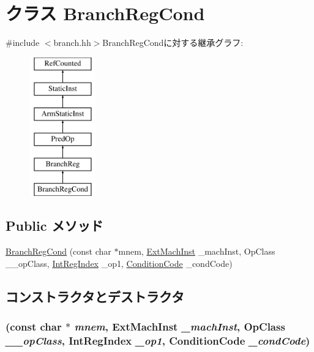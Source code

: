 \hypertarget{classArmISA_1_1BranchRegCond}{
\section{クラス BranchRegCond}
\label{classArmISA_1_1BranchRegCond}
}


{\ttfamily \#include $<$branch.hh$>$}BranchRegCondに対する継承グラフ:\begin{figure}[H]
\begin{center}
\leavevmode
\includegraphics[height=6cm]{classArmISA_1_1BranchRegCond}
\end{center}
\end{figure}
\subsection*{Public メソッド}
\begin{DoxyCompactItemize}
\item 
\hyperlink{classArmISA_1_1BranchRegCond_a78a9660cf99b9b9f1a776c128166c5a1}{BranchRegCond} (const char $\ast$mnem, \hyperlink{classStaticInst_a5605d4fc727eae9e595325c90c0ec108}{ExtMachInst} \_\-machInst, OpClass \_\-\_\-opClass, \hyperlink{namespaceArmISA_ae64680ba9fb526106829d6bf92fc791b}{IntRegIndex} \_\-op1, \hyperlink{namespaceArmISA_ab8f08e777c4753720cff841f81da8e06}{ConditionCode} \_\-condCode)
\end{DoxyCompactItemize}


\subsection{コンストラクタとデストラクタ}
\hypertarget{classArmISA_1_1BranchRegCond_a78a9660cf99b9b9f1a776c128166c5a1}{
\subsubsection[{BranchRegCond}]{ (const char $\ast$ {\em mnem}, \/  {\bf ExtMachInst} {\em \_\-machInst}, \/  OpClass {\em \_\-\_\-opClass}, \/  {\bf IntRegIndex} {\em \_\-op1}, \/  {\bf ConditionCode} {\em \_\-condCode})}}
\label{classArmISA_1_1BranchRegCond_a78a9660cf99b9b9f1a776c128166c5a1}



